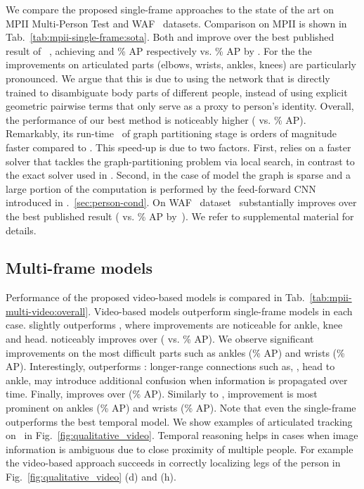  


 We compare the
proposed single-frame approaches to the state of the art on MPII
Multi-Person Test and WAF~\cite{eichner10eccv} datasets. Comparison on
MPII is shown in Tab.~\ref{tab:mpii-single-frame:sota}. Both 
and  improve over the best published result of
\deepercut{}~\cite{insafutdinov16arxiv}, achieving  and \%
AP respectively vs. \% AP by \deepercut{}. For the 
the improvements on articulated parts (elbows, wrists, ankles, knees)
are particularly pronounced. We argue that this is due to using the network
that is directly trained to disambiguate body parts of different
people, instead of using explicit geometric pairwise terms that only
serve as a proxy to person's identity. Overall, the performance of our
best  method is noticeably higher ( vs. \%
AP). Remarkably, its run-time \timeinfer~of graph partitioning stage is  orders of magnitude
faster compared to . This speed-up is due to two
factors. First,  relies on a faster solver
\cite{levinkov16arxiv} that tackles the graph-partitioning problem via
local search, in contrast to the exact solver used in
\cite{insafutdinov16eccv}. Second, in the case of  model
the graph is sparse and a large portion of the computation is
performed by the feed-forward CNN introduced in
\Sec.~\ref{sec:person-cond}. On WAF~\cite{eichner10eccv} dataset
\tdbushort~substantially improves over the best published result
( vs. \% AP by~\cite{insafutdinov16arxiv}). We refer to
supplemental material for details.





\subsection{Multi-frame models}

 Performance of the
proposed video-based models is compared in
Tab.~\ref{tab:mpii-multi-video:overall}. Video-based models outperform
single-frame models in each case.  slightly outperforms
, where improvements are noticeable for ankle, knee and
head.  noticeably improves over  (
vs. \% AP). We observe significant improvements on the most
difficult parts such as ankles (\% AP) and wrists (\%
AP). Interestingly,  outperforms :
longer-range connections such as, \eg, head to ankle, may introduce
additional confusion when information is propagated over
time. Finally,  improves over  (\%
AP). Similarly to , improvement is most prominent on
ankles (\% AP) and wrists (\% AP). Note that even the
single-frame \tdbushort{} outperforms the best temporal \bushort{}
model. 
We show examples of articulated tracking on \videodata~in Fig.~\ref{fig:qualitative_video}. Temporal reasoning helps in cases
when image information is ambiguous due to close proximity of multiple
people. For example the video-based approach succeeds in correctly
localizing legs of the person in Fig.~\ref{fig:qualitative_video} (d)
and (h). 


